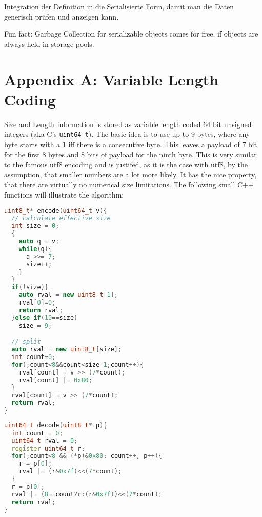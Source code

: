 \documentclass[a4paper,10pt]{article}
\begin{document}
Integration der Definition in die Serialisierte Form, damit man die Daten generisch prüfen und anzeigen kann.

Fun fact: Garbage Collection for serializable objects comes for free, if objects are always held in storage pools.

\newpage
\todos

\part{Appendix A: Variable Length Coding}

Size and Length information is stored as variable length coded 64 bit unsigned integers (aka C's \texttt{uint64\_t}). The basic idea is to use up to 9 bytes, where any byte starts with a 1 iff there is a consecutive byte. This leaves a payload of 7 bit for the first 8 bytes and 8 bits of payload for the ninth byte. This is very similar to the famous utf8 encoding and is justifed, as it is the case with utf8, by the assumption, that smaller numbers are a lot more likely. It has the nice property, that there are virtually no numerical size limitations.
The following small C++ functions will illustrate the algorithm:
\begin{lstlisting}[label=v64enc,caption=Variable Length Encoding,language=C++]
uint8_t* encode(uint64_t v){
  // calculate effective size
  int size = 0;
  {
    auto q = v;
    while(q){
      q >>= 7;
      size++;
    }
  }
  if(!size){
    auto rval = new uint8_t[1];
    rval[0]=0;
    return rval;
  }else if(10==size)
    size = 9;

  // split
  auto rval = new uint8_t[size];
  int count=0;
  for(;count<8&&count<size-1;count++){
    rval[count] = v >> (7*count);
    rval[count] |= 0x80;
  }
  rval[count] = v >> (7*count);
  return rval;
}
\end{lstlisting}
\begin{lstlisting}[label=v64dec,caption=Variable Length Decoding,language=C++]
uint64_t decode(uint8_t* p){
  int count = 0;
  uint64_t rval = 0;
  register uint64_t r;
  for(;count<8 && (*p)&0x80; count++, p++){
    r = p[0];
    rval |= (r&0x7f)<<(7*count);
  }
  r = p[0];
  rval |= (8==count?r:(r&0x7f))<<(7*count);
  return rval;
}
\end{lstlisting}
\end{document}

